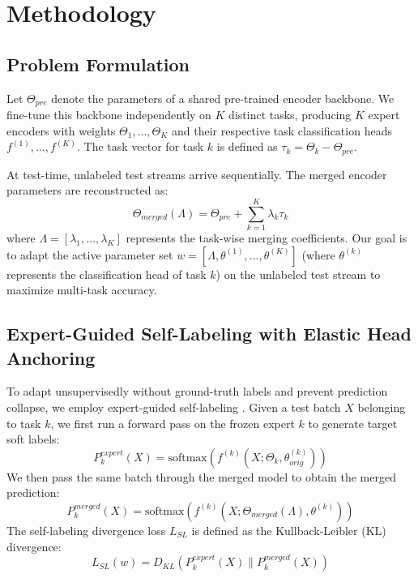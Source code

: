 \documentclass{article}
\theoremstyle{plain}
\theoremstyle{definition}
\theoremstyle{remark}
\begin{document}
\section{Methodology}
\label{sec:method}
\subsection{Problem Formulation}
Let $\Theta_{pre}$ denote the parameters of a shared pre-trained encoder backbone. We fine-tune this backbone independently on $K$ distinct tasks, producing $K$ expert encoders with weights $\Theta_1, \dots, \Theta_K$ and their respective task classification heads $f^{(1)}, \dots, f^{(K)}$. The task vector for task $k$ is defined as $\tau_k = \Theta_k - \Theta_{pre}$.

At test-time, unlabeled test streams arrive sequentially. The merged encoder parameters are reconstructed as:
\begin{equation}
\Theta_{merged}(\Lambda) = \Theta_{pre} + \sum_{k=1}^K \lambda_k \tau_k
\end{equation}
where $\Lambda = [\lambda_1, \dots, \lambda_K]$ represents the task-wise merging coefficients. Our goal is to adapt the active parameter set $w = [\Lambda, \theta^{(1)}, \dots, \theta^{(K)}]$ (where $\theta^{(k)}$ represents the classification head of task $k$) on the unlabeled test stream to maximize multi-task accuracy.

\subsection{Expert-Guided Self-Labeling with Elastic Head Anchoring}
To adapt unsupervisedly without ground-truth labels and prevent prediction collapse, we employ expert-guided self-labeling \cite{symerge}. Given a test batch $X$ belonging to task $k$, we first run a forward pass on the frozen expert $k$ to generate target soft labels:
\begin{equation}
P_k^{expert}(X) = \text{softmax}\left(f^{(k)}(X; \Theta_k, \theta^{(k)}_{orig})\right)
\end{equation}
We then pass the same batch through the merged model to obtain the merged prediction:
\begin{equation}
P_k^{merged}(X) = \text{softmax}\left(f^{(k)}(X; \Theta_{merged}(\Lambda), \theta^{(k)})\right)
\end{equation}
The self-labeling divergence loss $L_{SL}$ is defined as the Kullback-Leibler (KL) divergence:
\begin{equation}
L_{SL}(w) = D_{KL}\left(P_k^{expert}(X) \parallel P_k^{merged}(X)\right)
\end{equation}
\end{document}
